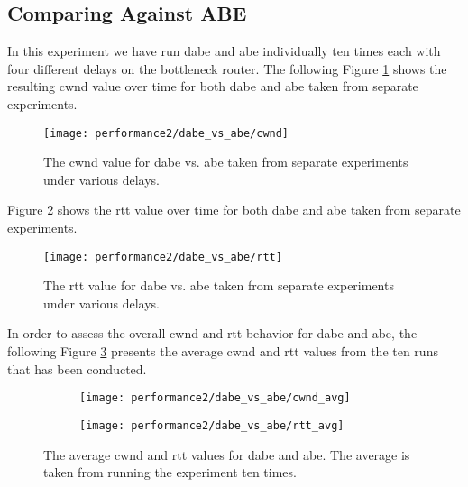 \subsection{Comparing Against ABE}

In this experiment we have run \gls{dabe} and \gls{abe} individually ten times each with four different delays on the bottleneck router. The following Figure \ref{fig:dabe_vs_abe_cwnd} shows the resulting \gls{cwnd} value over time for both \gls{dabe} and \gls{abe} taken from separate experiments.

\begin{figure}[H]
    \centering
    \texttt{[image: performance2/dabe\_vs\_abe/cwnd]}
    \captionsetup{width=1.0\linewidth}
    \caption{The \gls{cwnd} value for \gls{dabe} vs. \gls{abe} taken from separate experiments under various delays.}
    \label{fig:dabe_vs_abe_cwnd}
\end{figure}

Figure \ref{fig:dabe_vs_abe_rtt} shows the \gls{rtt} value over time for both \gls{dabe} and \gls{abe} taken from separate experiments.

\begin{figure}[H]
    \centering
    \texttt{[image: performance2/dabe\_vs\_abe/rtt]}
    \captionsetup{width=1.0\linewidth}
    \caption{The \gls{rtt} value for \gls{dabe} vs. \gls{abe} taken from separate experiments under various delays.}
    \label{fig:dabe_vs_abe_rtt}
\end{figure}

In order to assess the overall \gls{cwnd} and \gls{rtt} behavior for \gls{dabe} and \gls{abe}, the following Figure \ref{fig:dabe_vs_abe_avg} presents the average \gls{cwnd} and \gls{rtt} values from the ten runs that has been conducted.

\begin{figure}[H]
    \centering
    \begin{subfigure}{0.5\linewidth}
        \centering
        \texttt{[image: performance2/dabe\_vs\_abe/cwnd\_avg]}
    \end{subfigure}%
    \begin{subfigure}{0.5\linewidth}
        \centering
        \texttt{[image: performance2/dabe\_vs\_abe/rtt\_avg]}
    \end{subfigure}
    \caption{The average \gls{cwnd} and \gls{rtt} values for \gls{dabe} and \gls{abe}. The average is taken from running the experiment ten times.}
    \label{fig:dabe_vs_abe_avg}
\end{figure}

